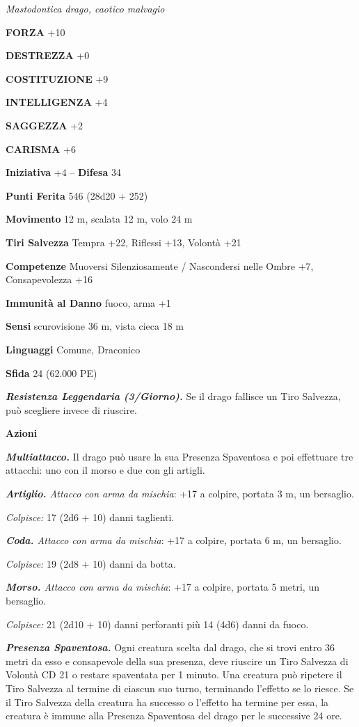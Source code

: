 \begin{multicols}{2}
\emph{Mastodontica drago, caotico malvagio}

\textbf{FORZA} +10

\textbf{DESTREZZA} +0

\textbf{COSTITUZIONE} +9

\textbf{INTELLIGENZA} +4

\textbf{SAGGEZZA} +2

\textbf{CARISMA} +6

\textbf{Iniziativa} +4 -- \textbf{Difesa} 34

\textbf{Punti Ferita} 546 (28d20 + 252)

\textbf{Movimento} 12 m, scalata 12 m, volo 24 m

\textbf{Tiri Salvezza} Tempra +22, Riflessi +13, Volontà +21

\textbf{Competenze} Muoversi Silenziosamente / Nascondersi nelle Ombre +7, Consapevolezza +16

\textbf{Immunità al Danno} fuoco, arma +1

\textbf{Sensi} scurovisione 36 m, vista cieca 18 m

\textbf{Linguaggi} Comune, Draconico

\textbf{Sfida} 24 (62.000 PE)

\emph{\textbf{Resistenza Leggendaria (3/Giorno).}} Se il drago fallisce un Tiro Salvezza, può scegliere invece di riuscire.

\textbf{Azioni}

\emph{\textbf{Multiattacco.}} Il drago può usare la sua Presenza Spaventosa e poi effettuare tre attacchi: uno con il morso e due con gli artigli.

\emph{\textbf{Artiglio.} Attacco con arma da mischia}: +17 a colpire, portata 3 m, un bersaglio.

\emph{Colpisce:} 17 (2d6 + 10) danni taglienti.

\emph{\textbf{Coda.} Attacco con arma da mischia}: +17 a colpire, portata 6 m, un bersaglio.

\emph{Colpisce:} 19 (2d8 + 10) danni da botta.

\emph{\textbf{Morso.} Attacco con arma da mischia}: +17 a colpire, portata 5 metri, un bersaglio.

\emph{Colpisce:} 21 (2d10 + 10) danni perforanti più 14 (4d6) danni da fuoco.

\emph{\textbf{Presenza Spaventosa.}} Ogni creatura scelta dal drago, che si trovi entro 36 metri da esso e consapevole della sua presenza, deve riuscire un Tiro Salvezza di Volontà CD 21 o restare spaventata per 1 minuto. Una creatura può ripetere il Tiro Salvezza al termine di ciascun suo turno, terminando l'effetto se lo riesce. Se il Tiro Salvezza della creatura ha successo o l'effetto ha termine per essa, la creatura è immune alla Presenza Spaventosa del drago per le successive 24 ore.


\end{multicols}
